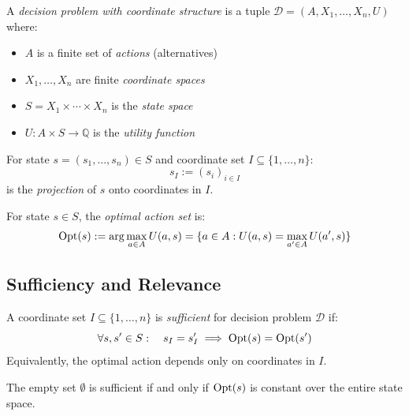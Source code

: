 \begin{definition}\label{def:decision-problem}
A \emph{decision problem with coordinate structure} is a tuple $\mathcal{D} = (A, X_1, \ldots, X_n, U)$ where:
\begin{itemize}
\item $A$ is a finite set of \emph{actions} (alternatives)
\item $X_1, \ldots, X_n$ are finite \emph{coordinate spaces}
\item $S = X_1 \times \cdots \times X_n$ is the \emph{state space}
\item $U : A \times S \to \mathbb{Q}$ is the \emph{utility function}
\end{itemize}
\end{definition}

\begin{definition}[Projection]\label{def:projection}
For state $s = (s_1, \ldots, s_n) \in S$ and coordinate set $I \subseteq \{1, \ldots, n\}$:
\[
s_I := (s_i)_{i \in I}
\]
is the \emph{projection} of $s$ onto coordinates in $I$.
\end{definition}

\begin{definition}\label{def:optimizer}
For state $s \in S$, the \emph{optimal action set} is:
\[
\mathrm{Opt}(s) := \arg\max_{a \in A} U(a, s) = \{a \in A : U(a,s) = \max_{a' \in A} U(a', s)\}
\]
\end{definition}

\subsection{Sufficiency and Relevance}

\begin{definition}\label{def:sufficient}
A coordinate set $I \subseteq \{1, \ldots, n\}$ is \emph{sufficient} for decision problem $\mathcal{D}$ if:
\[
\forall s, s' \in S: \quad s_I = s'_I \implies \mathrm{Opt}(s) = \mathrm{Opt}(s')
\]
Equivalently, the optimal action depends only on coordinates in $I$.
\end{definition}

\begin{proposition}\label{prop:empty-sufficient-constant}
The empty set $\emptyset$ is sufficient if and only if $\mathrm{Opt}(s)$ is constant over the entire state space.
\end{proposition}



